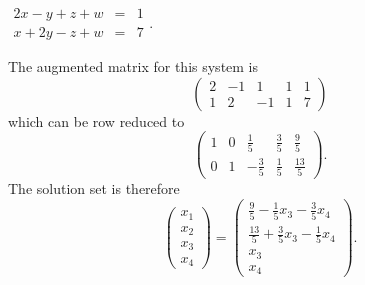\documentclass{ximera}
\begin{document}
\begin{exercise} \label{c2.3.10b}
$\begin{array}{rcl}
2x-y+z+w & = & 1\\
   x+2y-z+w & = & 7 \end{array}$.

\begin{solution}
The augmented matrix for this system is
\[
\left(\begin{array}{rrrr|r} 2 & -1 & 1 & 1 & 1 \\ 1 & 2 & -1 & 1 & 7
\end{array}\right)
\]
which can be row reduced to
\[
\left(\begin{array}{rrrr|r} 1 & 0 & \frac{1}{5} & \frac{3}{5} &
\frac{9}{5} \\ 0 & 1 & -\frac{3}{5} & \frac{1}{5} & \frac{13}{5}
\end{array}\right).
\]
The solution set is therefore
\[
\left(\begin{array}{c} x_1 \\ x_2 \\ x_3 \\ x_4\end{array}\right) =
\left(\begin{array}{c} \frac{9}{5} - \frac{1}{5}x_3 - \frac{3}{5}x_4
\\ \frac{13}{5} + \frac{3}{5}x_3 - \frac{1}{5}x_4 \\ x_3 \\ x_4
\end{array}\right).
\]

\end{solution}
\end{exercise}
\end{document}
